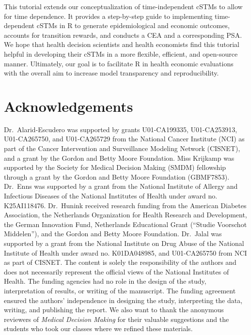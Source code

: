 \documentclass[
]{article}
\begin{document}
This tutorial extends our conceptualization of time-independent cSTMs to allow for time dependence. It provides a step-by-step guide to implementing time-dependent cSTMs in R to generate epidemiological and economic outcomes, accounts for transition rewards, and conducts a CEA and a corresponding PSA. We hope that health decision scientists and health economists find this tutorial helpful in developing their cSTMs in a more flexible, efficient, and open-source manner. Ultimately, our goal is to facilitate R in health economic evaluations with the overall aim to increase model transparency and reproducibility.

\hypertarget{acknowledgements}{%
\section{Acknowledgements}\label{acknowledgements}}

Dr.~Alarid-Escudero was supported by grants U01-CA199335, U01-CA253913, U01-CA265750, and U01-CA265729 from the National Cancer Institute (NCI) as part of the Cancer Intervention and Surveillance Modeling Network (CISNET), and a grant by the Gordon and Betty Moore Foundation. Miss Krijkamp was supported by the Society for Medical Decision Making (SMDM) fellowship through a grant by the Gordon and Betty Moore Foundation (GBMF7853). Dr.~Enns was supported by a grant from the National Institute of Allergy and Infectious Diseases of the National Institutes of Health under award no. K25AI118476. Dr.~Hunink received research funding from the American Diabetes Association, the Netherlands Organization for Health Research and Development, the German Innovation Fund, Netherlands Educational Grant (``Studie Voorschot Middelen''), and the Gordon and Betty Moore Foundation. Dr.~Jalal was supported by a grant from the National Institute on Drug Abuse of the National Institute of Health under award no. K01DA048985, and U01-CA265750 from NCI as part of CISNET. The content is solely the responsibility of the authors and does not necessarily represent the official views of the National Institutes of Health. The funding agencies had no role in the design of the study, interpretation of results, or writing of the manuscript. The funding agreement ensured the authors' independence in designing the study, interpreting the data, writing, and publishing the report. We also want to thank the anonymous reviewers of \emph{Medical Decision Making} for their valuable suggestions and the students who took our classes where we refined these materials.
\end{document}
